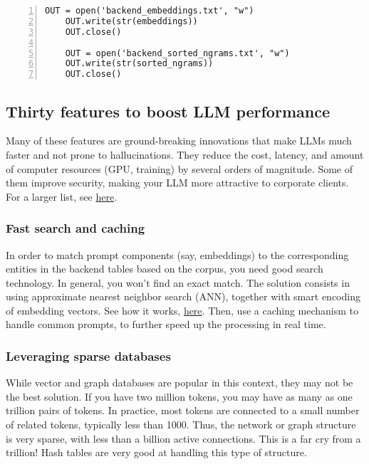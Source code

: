 \documentclass[10pt]{article}
\begin{document}
{\begin{lstlisting}[numbers=left,basicstyle=\ttfamily\footnotesize]
    OUT = open('backend_embeddings.txt', "w")
    OUT.write(str(embeddings))
    OUT.close()

    OUT = open('backend_sorted_ngrams.txt', "w")
    OUT.write(str(sorted_ngrams))
    OUT.close()

\end{lstlisting}

\subsection{Thirty features to boost LLM performance}

Many of these features are ground-breaking innovations that make LLMs much faster and not prone to hallucinations. They reduce the cost, latency, and amount of computer resources (GPU, training) by several orders of magnitude. Some of them improve security, making your LLM more attractive to corporate clients. For a larger list, see \href{https://mltblog.com/4gaWcqT}{here}. 

\subsubsection{Fast search and caching}
In order to match prompt components (say, embeddings) to the corresponding entities in the backend tables based on the corpus, you need good search technology. In general, you won’t find an exact match. The solution consists in using approximate nearest neighbor search (\textcolor{index}{ANN}), together with smart encoding of embedding vectors. See how it works, \href{https://mltblog.com/48hQWfY}{here}. Then, use a 
\textcolor{index}{caching} mechanism to handle common prompts, to further speed up the processing in real time.

\subsubsection{Leveraging sparse databases}
While vector and graph databases are popular in this context, they may not be the best solution. If you have two million tokens, you may have as many as one trillion pairs of tokens. In practice, most tokens are connected to a small number of related tokens, typically less than 1000. Thus, the network or graph structure is very sparse, with less than a billion active connections. This is a far cry from a trillion! Hash tables are very good at handling this type of structure.

}
\end{document}
